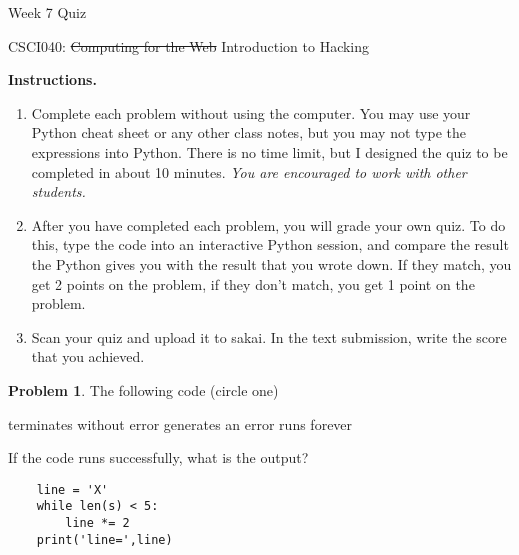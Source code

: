 \documentclass[10pt]{article}
\theoremstyle{definition}
\newtheorem{problem}{Problem}
\begin{document}
\begin{center}
    {
\Large
Week 7 Quiz
}

    \vspace{0.1in}
    CSCI040: \sout{Computing for the Web} Introduction to Hacking

    \vspace{0.1in}
\end{center}

\vspace{0.15in}
%
%

\noindent\textbf{Instructions.}
\begin{enumerate}
\item
Complete each problem without using the computer.  
You may use your Python cheat sheet or any other class notes,
but you may not type the expressions into Python.
There is no time limit, but I designed the quiz to be completed in about 10 minutes.
\emph{You are encouraged to work with other students.}
\item
After you have completed each problem, you will grade your own quiz.
To do this, type the code into an interactive Python session,
and compare the result the Python gives you with the result that you wrote down.
If they match, you get 2 points on the problem,
if they don't match, you get 1 point on the problem.
\item
Scan your quiz and upload it to sakai.
In the text submission, write the score that you achieved.
\end{enumerate}
\vspace{0.15in}

\begin{problem}
    The following code (circle one)

    \vspace{0.25in}
    \hspace{0.5in}terminates without error 
    \hspace{1in}generates an error
    \hspace{1in}runs forever
    \vspace{0.25in}

    \noindent
    If the code runs successfully, what is the output?
\end{problem}
\begin{lstlisting}
    line = 'X'
    while len(s) < 5:
        line *= 2
    print('line=',line)
\end{lstlisting}
\vspace{1in}
\end{document}
